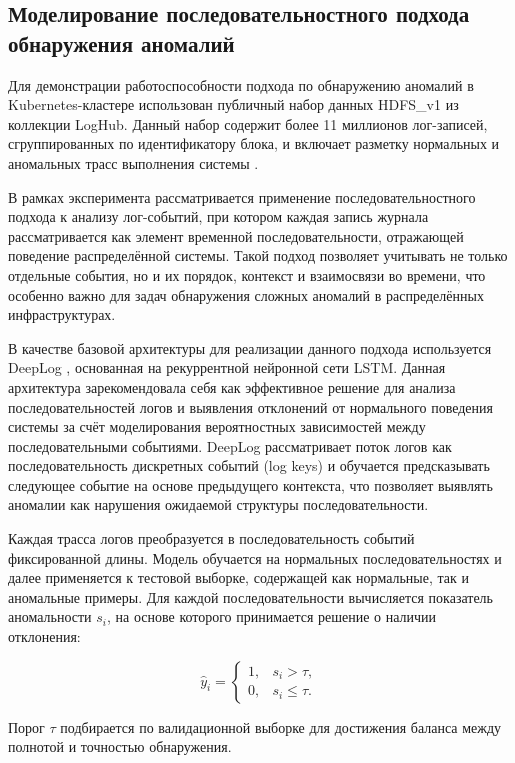 \subsection{Моделирование последовательностного подхода обнаружения аномалий}

Для демонстрации работоспособности подхода по обнаружению аномалий в Kubernetes-кластере использован публичный набор данных HDFS\_v1 из коллекции LogHub. Данный набор содержит более 11 миллионов лог-записей, сгруппированных по идентификатору блока, и включает разметку нормальных и аномальных трасс выполнения системы \cite{HDFS_dataset}.

В рамках эксперимента рассматривается применение последовательностного подхода к анализу лог-событий, при котором каждая запись журнала рассматривается как элемент временной последовательности, отражающей поведение распределённой системы. Такой подход позволяет учитывать не только отдельные события, но и их порядок, контекст и взаимосвязи во времени, что особенно важно для задач обнаружения сложных аномалий в распределённых инфраструктурах.

В качестве базовой архитектуры для реализации данного подхода используется DeepLog \cite{DeepLog}, основанная на рекуррентной нейронной сети LSTM. Данная архитектура зарекомендовала себя как эффективное решение для анализа последовательностей логов и выявления отклонений от нормального поведения системы за счёт моделирования вероятностных зависимостей между последовательными событиями. DeepLog рассматривает поток логов как последовательность дискретных событий (log keys) и обучается предсказывать следующее событие на основе предыдущего контекста, что позволяет выявлять аномалии как нарушения ожидаемой структуры последовательности.

Каждая трасса логов преобразуется в последовательность событий фиксированной длины. Модель обучается на нормальных последовательностях и далее применяется к тестовой выборке, содержащей как нормальные, так и аномальные примеры. Для каждой последовательности вычисляется показатель аномальности $s_i$, на основе которого принимается решение о наличии отклонения:

\nopagebreak
\begin{equation}
\hat{y}_i =
\begin{cases}
1, & s_i > \tau, \\
0, & s_i \leq \tau.
\end{cases}
\end{equation}

Порог $\tau$ подбирается по валидационной выборке для достижения баланса между полнотой и точностью обнаружения.

